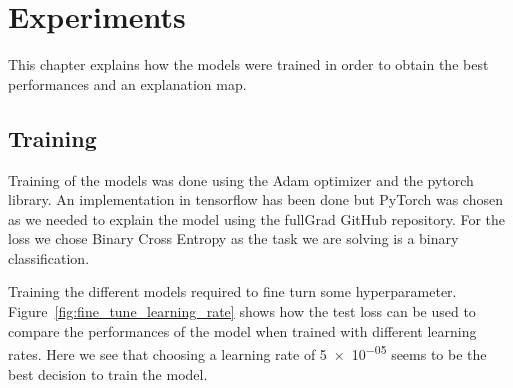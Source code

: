 \chapter{Experiments}
\label{chap:experiments}
This chapter explains how the models were trained in order to obtain the best performances and an explanation map.
\section{Training}
Training of the models was done using the Adam\cite{kingma2014adam} optimizer and the pytorch\cite{pytorch_paszke2017automatic} library. An implementation in tensorflow\cite{tensorflow_45166} has been done but PyTorch was chosen as we needed to explain the model using the fullGrad\cite{fullgradient} GitHub repository. For the loss we chose Binary Cross Entropy as the task we are solving is a binary classification.

Training the different models required to fine turn some hyperparameter. Figure~\ref{fig:fine_tune_learning_rate} shows how the test loss can be used to compare the performances of the model when trained with different learning rates. Here we see that choosing a learning rate of \num{5e-05} seems to be the best decision to train the model. 

